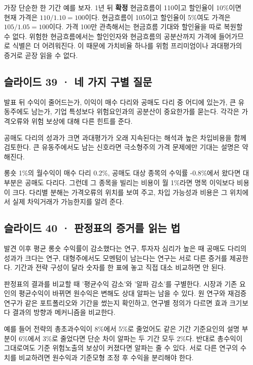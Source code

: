 \documentclass[11pt,a4paper]{article}
\begin{document}
가장 단순한 한 기간 예를 보자. 1년 뒤 \textbf{확정} 현금흐름이 110이고 할인율이 10\%이면 현재 가격은 $110/1.10=100$이다. 현금흐름이 105이고 할인율이 5\%여도 가격은 $105/1.05=100$이다. 가격 100만 관측해서는 현금흐름 기대와 할인율을 따로 복원할 수 없다. 위험한 현금흐름에서는 할인인자와 현금흐름의 공분산까지 가격에 들어가므로 식별은 더 어려워진다. 이 때문에 가치비율 하나를 위험 프리미엄이나 과대평가의 증거로 곧장 읽을 수 없다.\par

\subsection{슬라이드 39 · 네 가지 구별 질문}
발표 뒤 수익이 줄어드는가, 이익이 매수 다리와 공매도 다리 중 어디에 있는가, 큰 유동주에도 남는가, 기업 특성보다 위험요인과의 공분산이 중요한가를 묻는다. 각각은 가격오류와 위험 보상에 대해 다른 힌트를 준다.\par

공매도 다리의 성과가 크면 과대평가가 오래 지속된다는 해석과 높은 차입비용을 함께 검토한다. 큰 유동주에서도 남는 신호라면 극소형주의 가격 문제에만 기대는 설명은 약해진다.\par

롱숏 1\%의 월수익이 매수 다리 0.2\%, 공매도 대상 종목의 수익률 -0.8\%에서 왔다면 대부분은 공매도 다리다. 그런데 그 종목을 빌리는 비용이 월 1\%라면 명목 이익보다 비용이 크다. 다리별 분해는 가격오류의 위치를 보여 주고, 차입 가능성과 비용은 그 위치에서 실제 차익거래가 가능한지를 알려 준다.\par

\subsection{슬라이드 40 · 판정표의 증거를 읽는 법}
발견 이후 평균 롱숏 수익률이 감소했다는 연구, 투자자 심리가 높은 때 공매도 다리의 성과가 크다는 연구, 대형주에서도 모멘텀이 남는다는 연구는 서로 다른 증거를 제공한다. 기간과 전략 구성이 달라 숫자를 한 표에 놓고 직접 대소 비교하면 안 된다.\par

판정표의 결과를 비교할 때 '평균수익 감소'와 '알파 감소'를 구별한다. 시장과 기존 요인의 평균수익이 바뀌면 원수익은 변해도 상대 알파는 남을 수 있다. 원 연구와 재검증 연구가 같은 포트폴리오와 기간을 썼는지 확인하고, 연구별 정의가 다르면 효과 크기보다 결과의 방향과 메커니즘을 비교한다.\par

예를 들어 전략의 총초과수익이 8\%에서 5\%로 줄었어도 같은 기간 기준요인의 설명 부분이 6\%에서 3\%로 줄었다면 단순 차이 알파는 두 기간 모두 2\%다. 반대로 총수익이 그대로여도 기준 위험노출의 보상이 커졌다면 알파는 줄 수 있다. 서로 다른 연구의 수치를 비교하려면 원수익과 기준모형 조정 후 수익을 분리해야 한다.\par
\end{document}
